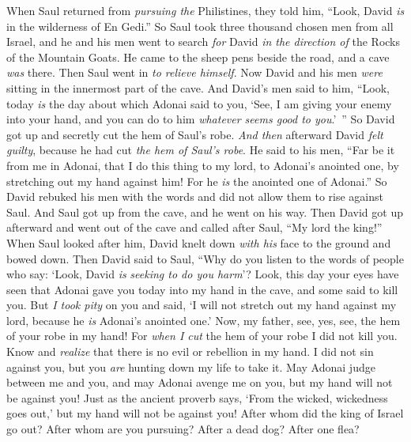 \begin{biblechapter} %
 When Saul returned from \textit{pursuing the} Philistines, they told him, “Look, David \textit{is} in the wilderness of En Gedi.”
\verse So Saul took three thousand chosen men from all Israel, and he and his men went to search \textit{for} David \textit{in the direction of} the Rocks of the Mountain Goats.
\verse He came to the sheep pens beside the road, and a cave \textit{was} there. Then Saul went in \textit{to relieve himself}. Now David and his men \textit{were} sitting in the innermost part of the cave.
\verse And David’s men said to him, “Look, today \textit{is} the day about which Adonai said to you, ‘See, I am giving your enemy into your hand, and you can do to him \textit{whatever seems good to you}.’ ” So David got up and secretly cut the hem of Saul’s robe.
\verse \textit{And then} afterward David \textit{felt guilty}, because he had cut \textit{the hem of Saul’s robe}.
\verse He said to his men, “Far be it from me in Adonai, that I do this thing to my lord, to Adonai’s anointed one, by stretching out my hand against him! For he \textit{is} the anointed one of Adonai.”
\verse So David rebuked his men with the words and did not allow them to rise against Saul. And Saul got up from the cave, and he went on his way.
\verse Then David got up afterward and went out of the cave and called after Saul, “My lord the king!” When Saul looked after him, David knelt down \textit{with his} face to the ground and bowed down.
\verse Then David said to Saul, “Why do you listen to the words of people who say: ‘Look, David \textit{is} \textit{seeking to do you harm}’?
\verse Look, this day your eyes have seen that Adonai gave you today into my hand in the cave, and some said to kill you. But \textit{I took pity} on you and said, ‘I will not stretch out my hand against my lord, because he \textit{is} Adonai’s anointed one.’
\verse Now, my father, see, yes, see, the hem of your robe in my hand! For \textit{when I cut} the hem of your robe I did not kill you. Know and \textit{realize} that there is no evil or rebellion in my hand. I did not sin against you, but you \textit{are} hunting down my life to take it.
\verse May Adonai judge between me and you, and may Adonai avenge me on you, but my hand will not be against you!
\verse Just as the ancient proverb says, ‘From the wicked, wickedness goes out,’ but my hand will not be against you!
\verse After whom did the king of Israel go out? After whom are you pursuing? After a dead dog? After one flea?

\end{biblechapter}
